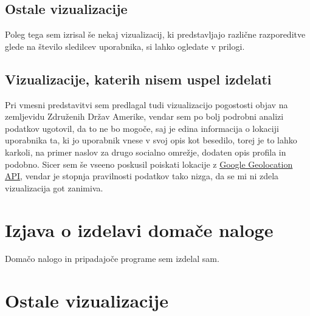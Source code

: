 \documentclass[a4paper,11pt]{article}
\begin{document}
\pagebreak

\subsection{Ostale vizualizacije}

Poleg tega sem izrisal še nekaj vizualizacij, ki predstavljajo različne razporeditve glede na število sledilcev uporabnika, si lahko ogledate v prilogi.

\subsection{Vizualizacije, katerih nisem uspel izdelati}

Pri vmesni predstavitvi sem predlagal tudi vizualizacijo pogostosti objav na zemljevidu Združenih Držav Amerike, vendar sem po bolj podrobni analizi podatkov ugotovil, da to ne bo mogoče, saj je edina informacija o lokaciji uporabnika ta, ki jo uporabnik vnese v svoj opis kot besedilo, torej je to lahko karkoli, na primer naslov za drugo socialno omrežje, dodaten opis profila in podobno. Sicer sem še vseeno poskusil poiskati lokacije z \href{https://developers.google.com/maps/documentation/business/geolocation/}\underline{Google Geolocation API}, vendar je stopnja pravilnosti podatkov tako nizga, da se mi ni zdela vizualizacija got zanimiva.

\section{Izjava o izdelavi domače naloge}
Domačo nalogo in pripadajoče programe sem izdelal sam.

\pagebreak
\appendix
\appendixpage
{}

\section{Ostale vizualizacije}
\end{document}
